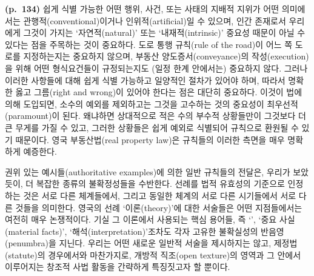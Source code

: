 \textbf{(p.~134)} 쉽게 식별 가능한 어떤 행위, 사건, 또는 사태의 지배적
지위가 어떤 의미에서는 관행적(conventional)이거나 인위적(artificial)일
수 있으며, 인간 존재로서 우리에게 그것이 가지는 ‘자연적(natural)’ 또는
‘내재적(intrinsic)’ 중요성 때문이 아닐 수 있다는 점을 주목하는 것이
중요하다. 도로 통행 규칙(rule of the road)이 어느 쪽 도로를 지정하는지는
중요하지 않으며, 부동산 양도증서(conveyance)의 작성(execution)을 위해
어떤 형식요건들이 규정되는지도 (일정 한계 안에서는) 중요하지 않다.
그러나 이러한 사항들에 대해 쉽게 식별 가능하고 일양적인 절차가 있어야
하며, 따라서 명확한 옳고 그름(right and wrong)이 있어야 한다는 점은
대단히 중요하다. 이것이 법에 의해 도입되면, 소수의 예외를 제외하고는
그것을 고수하는 것의 중요성이 최우선적(paramount)이 된다. 왜냐하면
상대적으로 적은 수의 부수적 상황들만이 그것보다 더 큰 무게를 가질 수
있고, 그러한 상황들은 쉽게 예외로 식별되어 규칙으로 환원될 수 있기
때문이다. 영국 부동산법(real property law)은 규칙들의 이러한 측면을 매우
명확하게 예증한다.

권위 있는 예시들(authoritative examples)에 의한 일반 규칙들의 전달은,
우리가 보았듯이, 더 복잡한 종류의 불확정성들을 수반한다. 선례를 법적
유효성의 기준으로 인정하는 것은 서로 다른 체계들에서, 그리고 동일한
체계의 서로 다른 시기들에서 서로 다른 것들을 의미한다. 영국의 선례
‘이론(theory)’에 대한 서술들은 어떤 지점들에서는 여전히 매우 논쟁적이다.
기실 그 이론에서 사용되는 핵심 용어들, 즉 ‘’, ‘중요 사실(material facts)’, ‘해석(interpretation)’조차도
각자 고유한 불확실성의 반음영(penumbra)을 지닌다. 우리는 어떤 새로운
일반적 서술을 제시하지는 않고, 제정법(statute)의 경우에서와 마찬가지로,
개방적 직조(open texture)의 영역과 그 안에서 이루어지는 창조적 사법
활동을 간략하게 특징짓고자 할 뿐이다.

